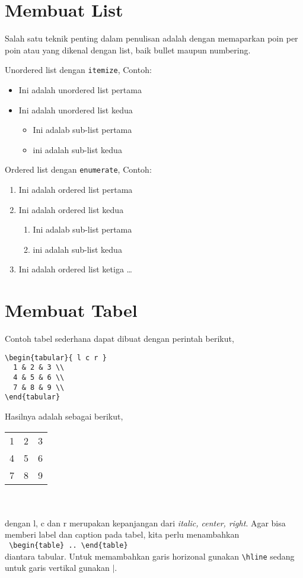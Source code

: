 \documentclass[12pt]{article}
\begin{document}
\section{Membuat List}
Salah satu teknik penting dalam penulisan adalah dengan memaparkan poin per poin atau yang dikenal dengan list, baik bullet maupun numbering.


Unordered list dengan \verb|itemize|, Contoh:
\begin{itemize}
\item Ini adalah unordered list pertama
\item Ini adalah unordered list kedua
    \begin{itemize}
    \item Ini adalab sub-list pertama
    \item ini adalah sub-list kedua
    \end{itemize}
\end{itemize}

Ordered list dengan \verb|enumerate|, Contoh:
\begin{enumerate}
\item Ini adalah ordered list pertama
\item Ini adalah ordered list kedua
    \begin{enumerate}
    \item Ini adalab sub-list pertama
    \item ini adalah sub-list kedua
    \end{enumerate}
\item Ini adalah ordered list ketiga \ldots
\end{enumerate}

\section{Membuat Tabel}
Contoh tabel sederhana dapat dibuat dengan perintah berikut,
\begin{verbatim}
\begin{tabular}{ l c r }
  1 & 2 & 3 \\
  4 & 5 & 6 \\
  7 & 8 & 9 \\
\end{tabular}
\end{verbatim}
Hasilnya adalah sebagai berikut,\\
\begin{tabular}{ l c r }
  1 & 2 & 3 \\
  4 & 5 & 6 \\
  7 & 8 & 9 \\
\end{tabular}
\\
\\
dengan l, c dan r merupakan kepanjangan dari \textit{italic, center, right}.
Agar bisa memberi label dan caption pada tabel, kita perlu menambahkan \\ 
\verb| \begin{table} .. \end{table}| \\
diantara tabular. Untuk memambahkan garis horizonal gunakan \texttt{\textbackslash hline} sedang untuk garis vertikal gunakan $\mid$.
\end{document}
